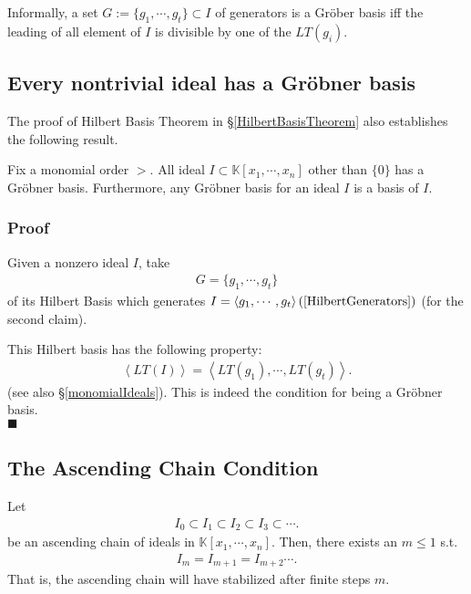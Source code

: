 \documentclass[11pt]{book}
\begin{document}
Informally, a set $G := \{g_1, \cdots, g_t\} \subset I$ of generators is a Gr\"ober basis iff the leading of all element of $I$ is divisible by one of the $LT(g_i)$.


\subsection{Every nontrivial ideal has a Gr\"obner basis}
The proof of Hilbert Basis Theorem in \S\ref{HilbertBasisTheorem} also establishes the following result.

Fix a monomial order $>$.
All ideal $I \subset \mathbb{K}[x_1, \cdots, x_{n}]$ other than $\{0\}$ has a Gr\"obner basis.
Furthermore, any Gr\"obner basis for an ideal $I$ is a basis of $I$.

\subsubsection{Proof}
Given a nonzero ideal $I$, take
\begin{eqnarray}
G = \{g_1, \cdots, g_t\}
\end{eqnarray}
of its Hilbert Basis which generates $I = \left< g_1, \cdots, g_t \right> (\ref{HilbertGenerators})$ (for the second claim).

This Hilbert basis has the following property:
\begin{eqnarray}
\left< LT(I) \right> = \left< LT(g_1), \cdots, LT(g_t) \right>.
\end{eqnarray}
(see also \S\ref{monomialIdeals}).
This is indeed the condition for being a Gr\"obner basis.\\
$\blacksquare$

\subsection{The Ascending Chain Condition}
\label{ACC}
Let
\begin{eqnarray}
I_0 \subset I_1 \subset I_2 \subset I_3 \subset \cdots.
\end{eqnarray}
be an ascending chain of ideals in $\mathbb{K}[x_1, \cdots, x_n]$.
Then, there exists an $m \leq 1$ s.t.
\begin{eqnarray}
I_{m} = I_{m+1} = I_{m+2} \cdots.
\end{eqnarray}
That is, the ascending chain will have stabilized after finite steps $m$.
\end{document}
